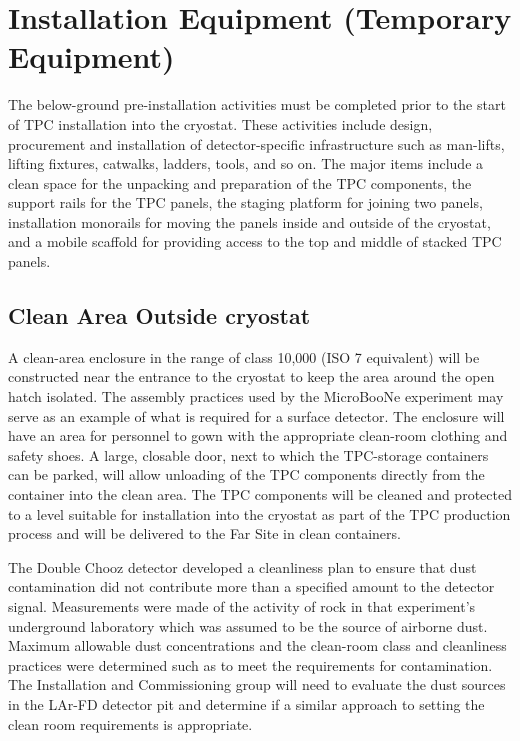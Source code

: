\section{Installation Equipment (Temporary Equipment)}
\label{fd:install:tempeqp}

The below-ground pre-installation activities must be completed prior to the start of TPC installation into the cryostat. These activities include design, procurement and installation of detector-specific 
infrastructure such as man-lifts, lifting fixtures, catwalks, ladders, tools, and so on. The major items include a clean space for the unpacking and preparation of the TPC components, the support rails for the 
TPC panels, the staging platform for joining two panels, installation monorails  for moving the panels inside and outside of the cryostat, and a mobile scaffold for providing access to 
the top and middle of stacked TPC panels. 

\subsection{Clean Area Outside cryostat}
\label{fd:install:tempeqp:cleanarea}

A clean-area enclosure in the range of class 10,000 (ISO 7 equivalent) will be constructed near the entrance to the cryostat to keep the area around the open hatch isolated. The assembly practices used by 
the MicroBooNe experiment may serve as an example of what is required for a surface detector. The enclosure will have an area for personnel to gown with the appropriate clean-room clothing and safety 
shoes. A large, closable door, next to which the TPC-storage containers can be parked, will allow unloading of the TPC components directly from the container into the clean area. The TPC components 
will be cleaned and protected to a level suitable for installation into the cryostat as part of the TPC production process and will be delivered to the Far Site in clean containers. 

The Double Chooz detector developed a cleanliness plan to ensure that dust contamination did not contribute more than a specified amount to the detector signal. Measurements were made of the activity 
of rock in that experiment’s underground laboratory which was assumed to be the source of airborne dust. Maximum allowable dust concentrations and the clean-room class and cleanliness practices were 
determined such as to meet the requirements for contamination. The Installation and Commissioning group will need to evaluate the dust sources in the LAr-FD detector pit and determine if a similar 
approach to setting the clean room requirements is appropriate. 

